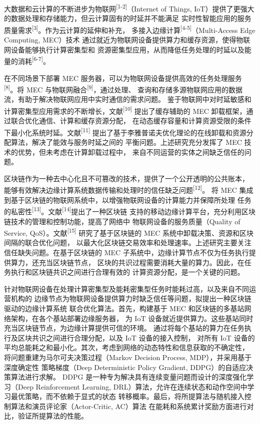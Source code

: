\introduction

大数据和云计算的不断进步为物联网\textsuperscript{[1-2]}（Internet of
Things, IoT）提供了更强大的数据处理和存储能力，但云计算固有的时延并不能满足
实时性智能应用的服务质量需求\textsuperscript{[3]}。作为云计算的延伸和补充，
多接入边缘计算\textsuperscript{[4-5]}（Multi-Access Edge Computing, MEC）技术
通过就近为物联网设备提供算力和缓存资源，使得物联网设备能够执行计算密集型和
资源密集型应用，从而降低任务处理的时延以及能量的消耗\textsuperscript{[6-7]}。

在不同场景下部署 MEC 服务器，可以为物联网设备提供高效的任务处理服务
\textsuperscript{[8]}。将 MEC 与物联网融合\textsuperscript{[9]}，通过处理、
查询和存储多源物联网应用的数据流，有助于解决物联网应用中实时通信的需求问题。
鉴于物联网中对时延敏感和计算密集型应用需求的不断增长，文献\textsuperscript{[10]}
提出了缓存辅助的 MEC 卸载框架，通过联合优化通信、计算和缓存资源分配，
在动态缓存容量和计算资源受限的条件下最小化系统时延。文献\textsuperscript{[11]}
提出了基于李雅普诺夫优化理论的在线卸载和资源分配算法，解决了能效与服务时延之间的
平衡问题。上述研究充分发挥了 MEC 技术的优势，但未考虑在计算卸载过程中，
来自不同运营的实体之间缺乏信任的问题。

区块链作为一种去中心化且不可篡改的技术，提供了一个公开透明的公共账本，
能够有效解决边缘计算系统数据传输和处理时的信任缺乏问题\textsuperscript{[12]}。
将 MEC 集成到基于区块链的物联网系统中，以增强物联网设备的计算能力并保障所处理
任务的私密性\textsuperscript{[13]}。文献\textsuperscript{[14]}提出了一种区块链
支持的移动边缘计算平台，充分利用区块链技术的管理和控制功能，提高了网络中
物联网设备的服务质量（Quality of Service, QoS）。文献\textsuperscript{[15]}
研究了基于区块链的 MEC 系统中卸载决策、资源和区块间隔的联合优化问题，
以最大化区块链交易效率和处理速率。上述研究主要关注信任缺失问题。在基于区块链的
MEC 子系统中，边缘计算节点不仅为任务执行提供算力，还充当区块链节点，
区块的共识过程需要消耗大量的算力。因此，在任务执行和区块链共识之间进行合理有效的
计算资源分配，是一个关键的问题。

针对物联网设备在处理计算密集型及能耗密集型任务时能耗过高，以及来自不同运营机构的
边缘节点为物联网设备提供算力时缺乏信任等问题，拟提出一种区块链驱动的边缘计算系统
联合优化算法。首先，构建基于 MEC 和区块链的多基站网络架构，在各个基站部署边缘服务器，
为 IoT 设备就近提供算力。这些基站同时充当区块链节点，为边缘计算提供可信的环境。
通过将每个基站的算力在任务执行及区块共识之间进行合理分配，以及 IoT 设备的接入控制，
对所有 IoT 设备的平均总能耗之和最小化。其次，考虑到网络的动态特性和信息获取的不确定性，
将问题重建为马尔可夫决策过程（Markov Decision Process, MDP），并采用基于深度确定性
策略梯度（Deep Deterministic Policy Gradient, DDPG）的自适应决策算法进行求解。
DDPG 是一种专为解决具有连续变量问题而设计的深度强化学习（Deep Reinforcement
Learning, DRL）算法，允许在连续状态和动作空间中学习最优策略，而不依赖于显式的状态
转移概率。最后，将所提算法与随机接入控制算法和演员评论家（Actor-Critic, AC）算法
在能耗和系统累计奖励方面进行对比，验证所提算法的性能。
